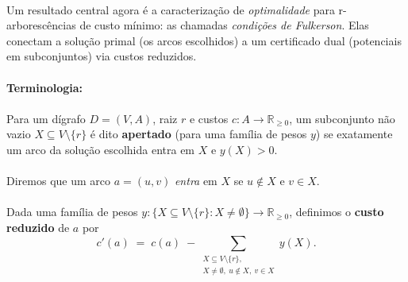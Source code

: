 \documentclass[12pt,a4paper]{article}
\begin{document}
\paragraph{}
Um resultado central agora é a caracterização de \emph{optimalidade} para r-arborescências de custo mínimo: as chamadas \emph{condições de Fulkerson}. Elas conectam a solução primal (os arcos escolhidos) a um certificado dual (potenciais em subconjuntos) via custos reduzidos.

\paragraph{Terminologia:} 
\paragraph{}
Para um dígrafo $D=(V,A)$, raiz $r$ e custos $c:A\to \mathbb{R}_{\ge 0}$, um subconjunto não vazio $X\subseteq V\setminus\{r\}$ é dito \textbf{apertado} (para uma família de pesos $y$) se exatamente um arco da solução escolhida entra em $X$ e $y(X)>0$. 

\paragraph{}
Diremos que um arco $a=(u,v)$ \emph{entra} em $X$ se $u\notin X$ e $v\in X$. 

\paragraph{}
Dada uma família de pesos $y: \{X\subseteq V\setminus\{r\}: X\neq\emptyset\}\to \mathbb{R}_{\ge 0}$, definimos o \textbf{custo reduzido} de $a$ por
\[
 c'(a) \;=\; c(a)\; - \sum_{\substack{X\subseteq V\setminus\{r\},\\ X\neq\emptyset,\ u\notin X,\ v\in X}} y(X).
\]
\end{document}
